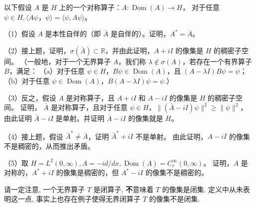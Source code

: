 \begin{4}
以下假设 $A$ 是 $H$ 上的一个对称算子：$A: \operatorname{Dom}(A) \rightarrow H$，
对于任意 $\psi \in H,\langle A \psi$，$\psi\rangle=\langle\psi, A \psi\rangle$。

（1）假设 $A$ 是本性自伴的（即 $\bar{A}$ 是自伴的）。证明，$A^{*}=\bar{A}$。

（2）接上题，证明，$\sigma(\bar{A}) \subset \mathbb{R}$，并由此证明，$A+i I$ 的像集是 $H$ 的稠密子空间。
（一般地，对于一个无界算子 $A$，我们称 $\lambda \notin \sigma(A)$，若存在一个有界算子 $B$，满足：
（a）对于任意 $\psi \in H$，$B \psi \in \operatorname{Dom}(A)$，且 $(A-\lambda I) B \psi=\psi$；
（b）对于任意 $\psi \in \operatorname{Dom}(A)$，$B(A-\lambda I) \psi=\psi$.）

（3）反之，假设 $A$ 是对称算子，且 $A+i I$ 和 $A-i I$ 的像集是 $H$ 的稠密子空间。
证明， $\bar{A}$ 是对称算子，且对于任意 $\psi \in H$，$\|(\bar{A}-i I) \psi\|^{2} \geqslant \|\psi\|^{2}$，
由此证明 $\bar{A}-i I$ 是单射。并证明 $\bar{A}-i I$ 的像集就是 $H$。

（4）接上题，假设 $\bar{A}^{*} \neq \bar{A}$，证明 $\bar{A}^{*}+i I$ 不是单射。
由此证明，$A-i I$ 的像集不是稠密的，从而推出矛盾。

（5）取 $H=L^{2}(0, \infty), A=-i d/dx, \operatorname{Dom}(A)=C_{c}^{\infty}(0, \infty)$。
证明，$A$ 是对称的，$A^{*}+i I$ 的像集是稠密的，但 $A^{*}-i I$ 的像集不是稠密的。
\end{4}
请一定注意, \textcolor{cc0000}{一个无界算子 $T$ 是闭算子, \textbf{不}意味着 $T$ 的像集是闭集.} 
定义中从未表明这一点, 事实上也存在例子使得无界闭算子 $T$ 的像集不是闭集.
